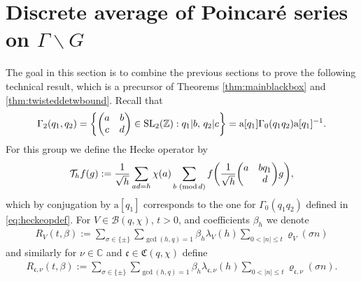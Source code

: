 \documentclass[12pt]{amsart}
\theoremstyle{definition}
\theoremstyle{remark}
\numberwithin{equation}{section}
\newcommand{\B}{\mathcal{B}}
\newcommand{\C}{{\mathbb C}}
\newcommand{\Z}{{\mathbb Z}}
\newcommand{\1}{{\mathbf 1}}
\newcommand{\SL}{\operatorname{SL}_2}
\renewcommand{\a}{\mathrm{a}}
\renewcommand{\c}{\mathfrak c}
\renewcommand{\pmod}[1]{\,\,(\mathrm{mod}\,{#1})}
\begin{document}
\section{Discrete average of Poincar\'e series on $\Gamma \backslash G$}\label{sec:discaverage}
The goal in this section is to combine the previous sections to prove the following technical result, which is a precursor of Theorems \ref{thm:mainblackbox} and \ref{thm:twisteddetwbound}. Recall that
\begin{align*}
 \Gamma_2(q_1,q_2) = \bigg \{ \mqty(a & b \\ c &d) \in \SL( \Z):  q_1 | b, \, q_2 | c \bigg\} = \a[q_1] \Gamma_0(q_1q_2) \a[q_1]^{-1}. 
\end{align*}
For this group we define the Hecke operator by
\begin{align} \label{eq:gamma2heckedef}
  \mathcal{T}_h f(g) :=  \frac{1}{\sqrt{h}} \sum_{ad=h} \chi(a) \sum_{b  \pmod{d}} f\bigg(\frac{1}{\sqrt{h}}\mqty(a & b q_1 \\ & d)g\bigg),
\end{align}
which by conjugation by $\a[q_1]$ corresponds to the one for $\Gamma_0(q_1q_2)$ defined in \eqref{eq:heckeopdef}. For $V \in \B(q,\chi)$, $t >0$, and coefficients $\beta_h$ we denote
\begin{align}\label{eq:RVdef}
  R_V(t,\beta) := \sum_{\sigma\in \{\pm\}}\sum_{\gcd(h,q)=1} \beta_h \lambda_V(h) \sum_{0< |n| \leq t} \varrho_V(\sigma n)  
\end{align}
and similarly for $\nu \in \C$ and $\c \in \mathfrak{C}(q,\chi)$ define
\begin{align}\label{eq:Rcnudef}
     R_{\c,\nu }(t,\beta) :=   \sum_{\sigma\in \{\pm\}}\sum_{\gcd(h,q)=1} \beta_h \lambda_{\c,\nu}(h) \sum_{0< |n| \leq t} \varrho_{\c,\nu}( \sigma n). 
\end{align}
\end{document}
